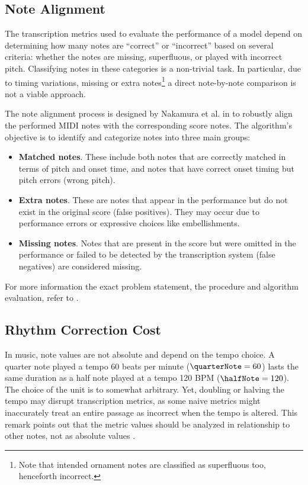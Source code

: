 \subsection{Note Alignment}

The transcription metrics used to evaluate the performance of a model depend on determining how many notes are ``correct'' or ``incorrect'' based on several criteria: whether the notes are missing, superfluous, or played with incorrect pitch. Classifying notes in these categories is a non-trivial task. In particular, due to timing variations, missing or extra notes\footnote{Note that intended ornament notes are classified as superfluous too, henceforth incorrect.} a direct note-by-note comparison is not a viable approach.

The note alignment process is designed by Nakamura et al. in \cite{Nakamura2017b} to robustly align the performed MIDI notes with the corresponding score notes. The algorithm's objective is to identify and categorize notes into three main groups: \begin{itemize}
	\item {\bf Matched notes}. These include both notes that are correctly matched in terms of pitch and onset time, and notes that have correct onset timing but pitch errors (wrong pitch).
	\item {\bf Extra notes}. These are notes that appear in the performance but do not exist in the original score (false positives). They may occur due to performance errors or expressive choices like embellishments.
	\item {\bf Missing notes}. Notes that are present in the score but were omitted in the performance or failed to be detected by the transcription system (false negatives) are considered missing.
\end{itemize}

For more information the exact problem statement, the procedure and algorithm evaluation, refer to \cite{Nakamura2017b}.

\subsection{Rhythm Correction Cost}

In music, note values are not absolute and depend on the tempo choice. A quarter note played a tempo $60$ beats per minute ($\quarterNote = 60$) lasts the same duration as a half note played at a tempo 120 BPM ($\halfNote = 120$). The choice of the unit is to somewhat arbitrary. Yet, doubling or halving the tempo may disrupt transcription metrics, as some naive metrics might inaccurately treat an entire passage as incorrect when the tempo is altered. This remark points out that the metric values should be analyzed in relationship to other notes, not as absolute values \cite[p. 7]{Nakamura2017c}.

